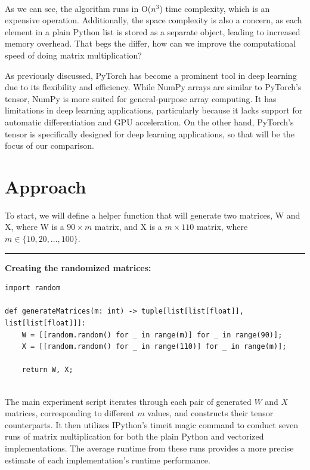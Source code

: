 \documentclass[12pt]{article}
\begin{document}
\noindent \\

As we can see, the algorithm runs in O(\( n^3 \)) time complexity, which is an expensive operation.
Additionally, the space complexity is also a concern, as each element in a plain Python list is stored as a separate object,
leading to increased memory overhead.
That begs the differ, how can we improve the computational speed of doing matrix multiplication?

As previously discussed, PyTorch has become a prominent tool in deep learning due to its flexibility and efficiency.
While NumPy arrays are similar to PyTorch's tensor, NumPy is more suited for general-purpose array computing.
It has limitations in deep learning applications, particularly because it lacks support for automatic differentiation and GPU acceleration.
On the other hand, PyTorch's tensor is specifically designed for deep learning applications,
so that will be the focus of our comparison.

\section{Approach}
To start, we will define a helper function that will generate two matrices, W and X, where
W is a \( 90 \times m \) matrix, and X is a \( m \times 110 \) matrix, where
\( m \in \{10, 20, ..., 100\} \).

\newpage

\noindent\rule{\textwidth}{0.4pt}
\noindent\textbf{Creating the randomized matrices:}
\begin{lstlisting}
import random

def generateMatrices(m: int) -> tuple[list[list[float]], list[list[float]]]:
    W = [[random.random() for _ in range(m)] for _ in range(90)];
    X = [[random.random() for _ in range(110)] for _ in range(m)];

    return W, X;
\end{lstlisting}

\noindent \\

\noindent The main experiment script iterates through each pair of generated \( W \) and \( X \) matrices,
corresponding to different \( m \) values, and constructs their tensor counterparts.
It then utilizes IPython's timeit magic command to conduct seven runs of matrix multiplication for both the plain Python and vectorized implementations.
The average runtime from these runs provides a more precise estimate of each implementation's runtime performance.
\end{document}
